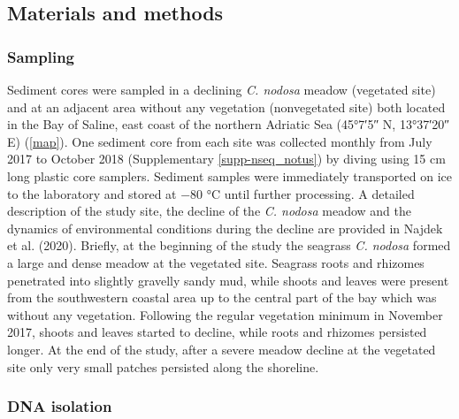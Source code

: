 \documentclass[12pt,]{article}
\begin{document}
\newpage

\hypertarget{materials-and-methods}{%
\subsection{Materials and methods}\label{materials-and-methods}}

\hypertarget{sampling}{%
\subsubsection{Sampling}\label{sampling}}

Sediment cores were sampled in a declining \emph{C. nodosa} meadow
(vegetated site) and at an adjacent area without any vegetation
(nonvegetated site) both located in the Bay of Saline, east coast of the
northern Adriatic Sea (\ang{45;7;5} N, \ang{13;37;20} E)
(\autoref{map}). One sediment core from each site was collected monthly
from July 2017 to October 2018 (Supplementary \autoref{supp-nseq_notus})
by diving using 15 cm long plastic core samplers. Sediment samples were
immediately transported on ice to the laboratory and stored at \num{-80}
\si{\degreeCelsius} until further processing. A detailed description of
the study site, the decline of the \emph{C. nodosa} meadow and the
dynamics of environmental conditions during the decline are provided in
Najdek et al. (2020). Briefly, at the beginning of the study the
seagrass \emph{C. nodosa} formed a large and dense meadow at the
vegetated site. Seagrass roots and rhizomes penetrated into slightly
gravelly sandy mud, while shoots and leaves were present from the
southwestern coastal area up to the central part of the bay which was
without any vegetation. Following the regular vegetation minimum in
November 2017, shoots and leaves started to decline, while roots and
rhizomes persisted longer. At the end of the study, after a severe
meadow decline at the vegetated site only very small patches persisted
along the shoreline.

\hypertarget{dna-isolation}{%
\subsubsection{DNA isolation}\label{dna-isolation}}
\end{document}
